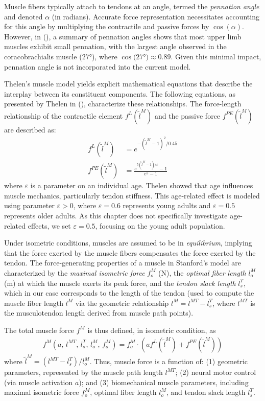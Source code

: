Muscle fibers typically attach to tendons at an angle, termed the \emph{pennation angle} and denoted $\alpha$ (in radians). Accurate force representation necessitates accounting for this angle by multiplying the contractile and passive forces by $\cos(\alpha)$. However, in (\cite{holzbaurModelUpperExtremity2005}), a summary of pennation angles shows that most upper limb muscles exhibit small pennation, with the largest angle observed in the coracobrachialis muscle ($27$°), where $\cos(27$°$) \approx 0.89$. Given this minimal impact, pennation angle is not incorporated into the current model.

Thelen's muscle model yields explicit mathematical equations that describe the interplay between its constituent components. The following equations, as presented by Thelen in (\cite{thelenAdjustmentMuscleMechanics2003}), characterize these relationships. The force-length relationship of the contractile element $f^L(\tilde{l}^M)$ and the passive force $f^{PE}(\tilde{l}^M)$ are described as:
\begin{align*}
    f^L(\tilde{l}^M) &= e^{-(\tilde{l}^M -1)^2 / 0.45} \\
    f^{PE}(\tilde{l}^M) &= \frac{e^{5(\tilde{l}^M - 1) / \varepsilon} - 1}{e^5 - 1}
\end{align*}
where $\varepsilon$ is a parameter on an individual age. Thelen showed that age influences muscle mechanics, particularly tendon stiffness.
This age-related effect is modeled using parameter $\varepsilon > 0$, where $\varepsilon = 0.6$ represents young adults and $\varepsilon = 0.5$ represents older adults. As this chapter does not specifically investigate age-related effects, we set $\varepsilon = 0.5$, focusing on the young adult population.

Under isometric conditions, muscles are assumed to be in \emph{equilibrium}, implying that the force exerted by the muscle fibers compensates the force exerted by the tendon.
The force-generating properties of a muscle in Stanford's model are characterized by the \emph{maximal isometric force} $f_o^M$ (N), the \emph{optimal fiber length} $l_o^M$ (m) at which the muscle exerts its peak force, and the \emph{tendon slack length} $l_s^T$, which in our case corresponds to the length of the tendon (used to compute the muscle fiber length $l^M$ via the geometric relationship $l^M = l^{MT} - l_s^T$, where $l^{MT}$ is the musculotendon length derived from muscle path points).

The total muscle force $f^M$ is thus defined, in isometric condition, as
\begin{align*}
    f^M(a,\, l^{MT}, \, l_s^T,\, l_o^M,\,f_o^M) = f_o^M \cdot \left( af^L(\tilde{l}^M) + f^{PE}(\tilde{l}^M) \right)
\end{align*}
where $\tilde{l}^M = (l^{MT} - l_s^T) / l_o^M$. Thus, muscle force is a function of: (1) geometric parameters, represented by the muscle path length $l^{MT}$; (2) neural motor control (via muscle activation $a$); and (3) biomechanical muscle parameters, including maximal isometric force $f_o^M$, optimal fiber length $l_o^M$, and tendon slack length $l_s^T$.

